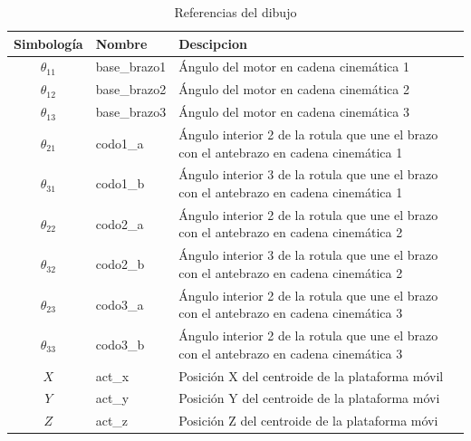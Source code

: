         \begingroup
            \renewcommand{\arraystretch}{2.0}
            \begin{table}[H]
                \centering
                \begin{tabular}{c m{2.5cm} m{8cm}}
                   \hline                   \hline
                   \textbf{Simbología}  &  \textbf{Nombre}  & \textbf{Descipcion}    \\\hline \hline 
                   $\theta_{11}$  & base\_brazo1    & Ángulo del motor en cadena cinemática 1                       \\\hline
                   $\theta_{12}$  & base\_brazo2    & Ángulo del motor en cadena cinemática 2                            \\\hline
                   $\theta_{13}$  & base\_brazo3    & Ángulo del motor en cadena cinemática 3                            \\\hline
                   $\theta_{21}$  & codo1\_a    & Ángulo interior 2 de la rotula que une el brazo con el antebrazo en cadena cinemática 1                       \\\hline
                   $\theta_{31}$  & codo1\_b    & Ángulo interior 3 de la rotula que une el brazo con el antebrazo en cadena cinemática 1                       \\\hline
                   $\theta_{22}$  & codo2\_a    & Ángulo interior 2 de la rotula que une el brazo con el antebrazo en cadena cinemática 2                       \\\hline
                   $\theta_{32}$  & codo2\_b    & Ángulo interior 3 de la rotula que une el brazo con el antebrazo en cadena cinemática 2                       \\\hline
                   $\theta_{23}$  & codo3\_a    & Ángulo interior 2 de la rotula que une el brazo con el antebrazo en cadena cinemática 3                       \\\hline
                   $\theta_{33}$  & codo3\_b    & Ángulo interior 2 de la rotula que une el brazo con el antebrazo en cadena cinemática 3                       \\\hline
                   $X$  & act\_x    & Posición X del centroide de la plataforma móvil                       \\\hline
                   $Y$  & act\_y    & Posición Y del centroide de la plataforma móvi                       \\\hline
                   $Z$  & act\_z    & Posición Z del centroide de la plataforma móvi                       \\\hline                   \hline

                \end{tabular}
                \caption{Referencias del dibujo}
                \label{tab:cap6_rviz_1}
            \end{table}
        \endgroup


